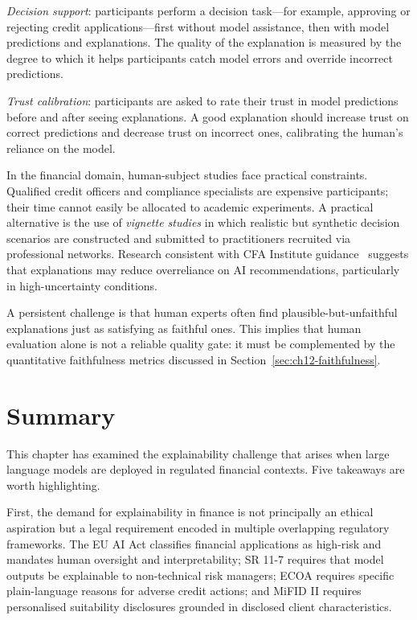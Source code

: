 \emph{Decision support}: participants perform a decision task---for example, approving or
rejecting credit applications---first without model assistance, then with model
predictions and explanations. The quality of the explanation is measured by the degree
to which it helps participants catch model errors and override incorrect predictions.

\emph{Trust calibration}: participants are asked to rate their trust in model predictions
before and after seeing explanations. A good explanation should increase trust on correct
predictions and decrease trust on incorrect ones, calibrating the human's reliance on
the model.

In the financial domain, human-subject studies face practical constraints. Qualified
credit officers and compliance specialists are expensive participants; their time cannot
easily be allocated to academic experiments. A practical alternative is the use of
\emph{vignette studies} in which realistic but synthetic decision scenarios are constructed
and submitted to practitioners recruited via professional networks. Research consistent with CFA Institute guidance~\cite{cfainstitute2025xai} suggests that explanations may reduce overreliance on AI recommendations, particularly in high-uncertainty conditions.

A persistent challenge is that human experts often find plausible-but-unfaithful
explanations just as satisfying as faithful ones. This implies that human evaluation
alone is not a reliable quality gate: it must be complemented by the quantitative
faithfulness metrics discussed in Section~\ref{sec:ch12-faithfulness}.

\section{Summary}
\label{sec:ch12-summary}

This chapter has examined the explainability challenge that arises when large language
models are deployed in regulated financial contexts. Five takeaways are worth
highlighting.

First, the demand for explainability in finance is not principally an ethical aspiration
but a legal requirement encoded in multiple overlapping regulatory frameworks. The EU
AI Act classifies financial applications as high-risk and mandates human oversight and
interpretability; SR 11-7 requires that model outputs be explainable to non-technical
risk managers; ECOA requires specific plain-language reasons for adverse credit actions;
and MiFID II requires personalised suitability disclosures grounded in disclosed client
characteristics.

